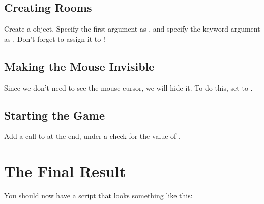 \documentclass[letterpaper,10pt,english]{sphinxmanual}
\begin{document}
\subsection{Creating Rooms}
\label{pong:creating-rooms}
Create a  object.  Specify the first argument as
, and specify the keyword argument  as
.  Don't forget to assign it to
!


\subsection{Making the Mouse Invisible}
\label{pong:making-the-mouse-invisible}
Since we don't need to see the mouse cursor, we will hide it.  To do
this, set  to .


\subsection{Starting the Game}
\label{pong:id1}
Add a call to  at the end, under a check for the
value of .


\section{The Final Result}
\label{pong:the-final-result}
You should now have a script that looks something like this:
\end{document}
